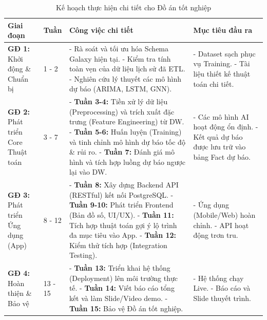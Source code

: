\begin{table}[H]
\centering
\caption{Kế hoạch thực hiện chi tiết cho Đồ án tốt nghiệp}
\begin{tabular}{|p{3.5cm}|p{1.5cm}|p{6cm}|p{4cm}|}
\hline
\textbf{Giai đoạn} & \textbf{Tuần} & \textbf{Công việc chi tiết} & \textbf{Mục tiêu đầu ra} \\ \hline

\textbf{GĐ 1:} \newline Khởi động \& Chuẩn bị & 1 - 2 & 
- Rà soát và tối ưu hóa Schema Galaxy hiện tại. \newline
- Kiểm tra tính toàn vẹn của dữ liệu lịch sử đã ETL. \newline
- Nghiên cứu lý thuyết các mô hình dự báo (ARIMA, LSTM, GNN). & 
- Dataset sạch phục vụ Training. \newline
- Tài liệu thiết kế thuật toán chi tiết. \\ \hline

\textbf{GĐ 2:} \newline Phát triển Core Thuật toán & 3 - 7 & 
- \textbf{Tuần 3-4:} Tiền xử lý dữ liệu (Preprocessing) và trích xuất đặc trưng (Feature Engineering) từ DW. \newline
- \textbf{Tuần 5-6:} Huấn luyện (Training) và tinh chỉnh mô hình dự báo tốc độ \& rủi ro. \newline
- \textbf{Tuần 7:} Đánh giá mô hình và tích hợp luồng dự báo ngược lại vào DW. & 
- Các mô hình AI hoạt động ổn định. \newline
- Kết quả dự báo được lưu trữ vào bảng Fact dự báo. \\ \hline

\textbf{GĐ 3:} \newline Phát triển Ứng dụng (App) & 8 - 12 & 
- \textbf{Tuần 8:} Xây dựng Backend API (RESTful) kết nối PostgreSQL. \newline
- \textbf{Tuần 9-10:} Phát triển Frontend (Bản đồ số, UI/UX). \newline
- \textbf{Tuần 11:} Tích hợp thuật toán gợi ý lộ trình đa mục tiêu vào App. \newline
- \textbf{Tuần 12:} Kiểm thử tích hợp (Integration Testing). & 
- Ứng dụng (Mobile/Web) hoàn chỉnh. \newline
- API hoạt động trơn tru. \\ \hline

\textbf{GĐ 4:} \newline Hoàn thiện \& Bảo vệ & 13 - 15 & 
- \textbf{Tuần 13:} Triển khai hệ thống (Deployment) lên môi trường thực tế. \newline
- \textbf{Tuần 14:} Viết báo cáo tổng kết và làm Slide/Video demo. \newline
- \textbf{Tuần 15:} Bảo vệ Đồ án tốt nghiệp. & 
- Hệ thống chạy Live. \newline
- Báo cáo và Slide thuyết trình. \\ \hline
\end{tabular}
\end{table}